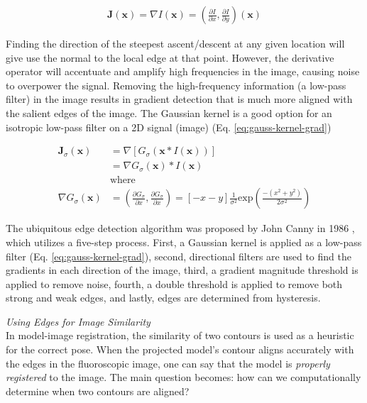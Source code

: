 \begin{equation}
    \begin{aligned}
        \mathbf{J}(\mathbf{x}) = \nabla I(\mathbf{x}) = (\frac{\partial I}{\partial x}, \frac{\partial I}{\partial y})(\mathbf{x})
    \end{aligned}
    \label{eq:img-grad}
\end{equation}

Finding the direction of the steepest ascent/descent at any given location will give use the normal to the local edge at that point. However, the derivative operator will accentuate and amplify high frequencies in the image, causing noise to overpower the signal. Removing the high-frequency information (a low-pass filter) in the image results in gradient detection that is much more aligned with the salient edges of the image. The Gaussian kernel is a good option for an isotropic low-pass filter on a 2D signal (image) (Eq. \ref{eq:gauss-kernel-grad})

\begin{equation}
    \begin{aligned}
        \mathbf{J}_{\sigma}(\mathbf{x}) &= \nabla [G_\sigma (\mathbf{x} * I(\mathbf{x}))] \\
        &= \nabla G_\sigma (\mathbf{x}) * I(\mathbf{x}) \\
        &\text{where} \\
        \nabla G_\sigma (\mathbf{x}) &= (\frac{\partial G_{\sigma}}{\partial x}, \frac{\partial G_{\sigma}}{\partial x}) = [-x - y]\frac{1}{\sigma^{2}}\text{exp}(\frac{-(x^2 + y^2)}{2 \sigma^2})
    \end{aligned}
    \label{eq:gauss-kernel-grad}
\end{equation}


The ubiquitous edge detection algorithm was proposed by John Canny in 1986 \cite{cannyComputationalApproachEdge1986}, which utilizes a five-step process. First, a Gaussian kernel is applied as a low-pass filter (Eq. \ref{eq:gauss-kernel-grad}), second, directional filters are used to find the gradients in each direction of the image, third, a gradient magnitude threshold is applied to remove noise, fourth, a double threshold is applied to remove both strong and weak edges, and lastly, edges are determined from hysteresis. 

\emph{Using Edges for Image Similarity}\\
In model-image registration, the similarity of two contours is used as a heuristic for the correct pose. When the projected model's contour aligns accurately with the edges in the fluoroscopic image, one can say that the model is \emph{properly registered} to the image. The main question becomes: how can we computationally determine when two contours are aligned?

